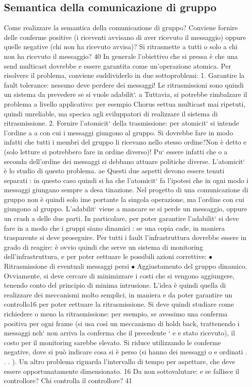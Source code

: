 \documentclass[a4paper,12pt]{article}
\begin{document}
\subsection{Semantica della comunicazione di gruppo}
Come realizzare la semantica della comunicazione di gruppo? Conviene fornire
delle conferme positive (i riceventi avvisano di aver ricevuto il messaggio) oppure
quelle negative (chi non ha ricevuto avvisa)? Si ritrasmette a tutti o solo a chi
non ha ricevuto il messaggio?
40
In generale l'obiettivo che si pressa è che una send multicast dovrebbe
e
essere garantita come un'operazione atomica. Per risolvere il problema, conviene
suddividerlo in due sottoproblemi:
1. Garantire la fault tolerance: nessuno deve perdere dei messaggi! Le ritrasmissioni sono quindi un sistema da
prevedere se si vuole adabilit`.
a
Tuttavia, si potrebbe rimbalzare il problema a livello applicativo: per
esempio Chorus eettua multicast mai ripetuti, quindi unreliable, ma
specica agli sviluppatori di realizzare il sistema di ritrasmissione.
2. Fornire l'atomicit` della trasmissione: per atomicit` si intende l'ordine
a
a
con cui i messaggi giungono al gruppo. Si dovrebbe fare in modo infatti
che tutti i membri del gruppo li ricevano nello stesso ordine?Non è detto
e
(solo letture si potrebbero fare in ordine diverso)! Pu` essere infatti che
o
a seconda dell'ordine dei messaggi si debbano attuare politiche diverse.
L'atomicit` è lo studio di questo problema.
ae
Questi due aspetti devono essere tenuti separati : in questo caso quindi si ha
che l'atomicit` fa l'ipotesi che in ogni modo i messaggi giungano sempre a desa
tinazione. Nel progetto di una comunicazione di gruppo non è quindi solo ime
portante la singola operazione, ma l'ordine con cui giungono al gruppo.
L'adabilit` viene a mancare se si perde un messaggio, oppure un crash
a
delle due parti. In particolare, per poter garantire l'adabilit` si deve fare in
a
modo che i gruppi siano dinamici : se una copia cade, in maniera trasparente
si deve proseguire. Per tutti i fault l'infrastruttura dovrebbe essere in grado di
reagire: è ovvio quindi che serve un sistema di monitoring dell'infrastruttura,
e
per poter eettuare le possibili azioni correttive:
$\bullet$ Ritrasmissione di eventuali messaggi persi
$\bullet$ Aggiustamento del gruppo dinamico.
Ovviamente, si deve cercare di minimizzare i costi che si vengono aggiungere,
tenendo conto del principio di minima intrusione.
L'idea è quindi quella di realizzare dei meccanismi molto semplici, in maniera
e
da poter garantire un controllo16 per poter eettuare la ritrasmissione. Si deve
quindi studiare come richiedere o meno la ritrasmissione: per esempio, se avessimo una conferma positiva per ogni frame
(si usa così un meccanismo di hold\i{}
back, trattenendo i messaggi nch` non arriva la conferma che il precedente `
e
e
stato ricevuto), il costo per il monitoring sarebbe elevato. Si riduce utilizzando
le conferme negative, dove si può indicare cosa si è perso (si hanno dei messaggi
o
e
ordinati . . . ). Un altro problema riguarda l'intervallo di tempo per aspettare,
che deve essere opportunatamente dimensionato.
16 Da
non sottovalutare: e se fallisce il controllore? Chi controlla il controllore?
41
\end{document}
